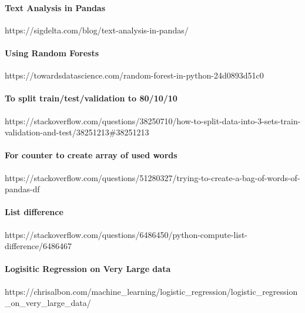 \documentclass[11pt]{article}
\begin{document}
\paragraph{Text Analysis in Pandas}\label{text-analysis-in-pandas}

https://sigdelta.com/blog/text-analysis-in-pandas/

\paragraph{Using Random Forests}\label{using-random-forests}

https://towardsdatascience.com/random-forest-in-python-24d0893d51c0

\paragraph{To split train/test/validation to
80/10/10}\label{to-split-traintestvalidation-to-801010}

https://stackoverflow.com/questions/38250710/how-to-split-data-into-3-sets-train-validation-and-test/38251213\#38251213

\paragraph{For counter to create array of used
words}\label{for-counter-to-create-array-of-used-words}

https://stackoverflow.com/questions/51280327/trying-to-create-a-bag-of-words-of-pandas-df

\paragraph{List difference}\label{list-difference}

https://stackoverflow.com/questions/6486450/python-compute-list-difference/6486467

\paragraph{Logisitic Regression on Very Large
data}\label{logisitic-regression-on-very-large-data}

https://chrisalbon.com/machine\_learning/logistic\_regression/logistic\_regression\_on\_very\_large\_data/


    
    
    
    
\end{document}
